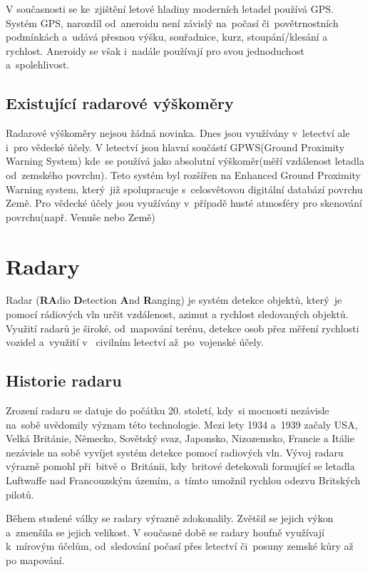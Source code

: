 		V současnosti se ke~zjištění letové hladiny moderních letadel používá GPS. Systém GPS, narozdíl od~aneroidu není závislý na~počasí či~povětrnostních podmínkách a~udává přesnou výšku, souřadnice, kurz, stoupání/klesání a rychlost. Aneroidy se však i~nadále používají pro svou jednoduchost a~spolehlivost.
		
		\subsection{Existující radarové výškoměry}
			Radarové výškoměry nejsou žádná novinka. Dnes jsou využívány v~letectví ale i~pro vědecké účely.
			V letectví jsou hlavní součástí GPWS(Ground Proximity Warning System) kde~se používá jako absolutní výškoměr(měří vzdálenost letadla od~zemského povrchu). Teto systém byl rozšířen na Enhanced Ground Proximity Warning system, který~již spolupracuje s~celosvětovou digitální databází povrchu Země.
			Pro vědecké účely jsou využívány v~případě husté atmosféry pro skenování povrchu(např. Venuše nebo Země)

	\section{Radary}\label{uvod::radary}
		Radar (\textbf{RA}dio \textbf{D}etection \textbf{A}nd \textbf{R}anging) je systém detekce objektů, který~je pomocí rádiových vln určit vzdálenost, azimut a rychlost sledovaných objektů. Využití radarů je široké, od~mapování terénu, detekce osob přez měření rychlosti vozidel a~využití v ~civilním letectví až~po~vojenské účely.

		\subsection{Historie radaru}\label{uvod::radary::historieRadaru}
			Zrození radaru se datuje do počátku 20. století, kdy~si mocnosti nezávisle na~sobě uvědomily význam této technologie. Mezi lety 1934 a~1939 začaly USA, Velká Británie, Německo, Sovětský svaz, Japonsko, Nizozemsko, Francie a Itálie nezávisle na sobě vyvíjet systém detekce pomocí radiových vln.\cite{history::radar} Vývoj radaru výrazně pomohl při~bitvě o~Británii, kdy~britové detekovali formující se letadla Luftwaffe nad Francouzským územím, a~tímto umožnil rychlou odezvu Britských pilotů.\par
			
			Během studené války se radary výrazně zdokonalily. Zvětšil se jejich výkon a~zmenšila se jejich velikost. V současné době se radary houfně využívají k~mírovým účelům, od~sledování počasí přes letectví či~posuny zemské kůry až po mapování.
			
